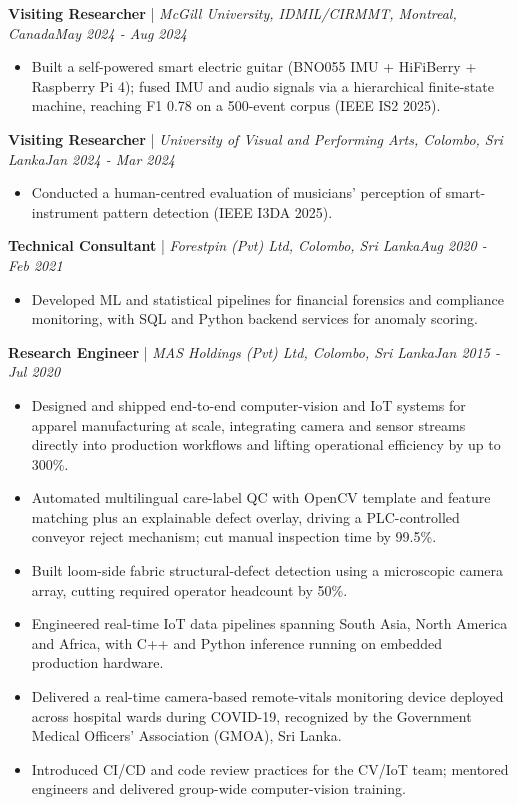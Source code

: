 \documentclass[11pt]{article}
\newenvironment{cvrole}[5]{%
  \par\noindent\textbf{\large #1} | \textit{\small #2, #3}\hfill \textit{\small #4 - #5}\par
  \begin{itemize}[leftmargin=2em, itemsep=-0.3em, topsep=-0.5em]%
}{%
  \end{itemize}\par\noindent\mbox{}\par\vspace{0.1em}%
}
\begin{document}
\begin{cvrole}{Visiting Researcher}{McGill University, IDMIL/CIRMMT}{Montreal, Canada}{May 2024}{Aug 2024}
\item Built a self-powered smart electric guitar (BNO055 IMU + HiFiBerry + Raspberry Pi 4); fused IMU and audio signals via a hierarchical finite-state machine, reaching F1 0.78 on a 500-event corpus (IEEE IS2 2025).
\end{cvrole}

\begin{cvrole}{Visiting Researcher}{University of Visual and Performing Arts}{Colombo, Sri Lanka}{Jan 2024}{Mar 2024}
\item Conducted a human-centred evaluation of musicians' perception of smart-instrument pattern detection (IEEE I3DA 2025).
\end{cvrole}

\begin{cvrole}{Technical Consultant}{Forestpin (Pvt) Ltd}{Colombo, Sri Lanka}{Aug 2020}{Feb 2021}
\item Developed ML and statistical pipelines for financial forensics and compliance monitoring, with SQL and Python backend services for anomaly scoring.
\end{cvrole}

\begin{cvrole}{Research Engineer}{MAS Holdings (Pvt) Ltd}{Colombo, Sri Lanka}{Jan 2015}{Jul 2020}
\item Designed and shipped end-to-end computer-vision and IoT systems for apparel manufacturing at scale, integrating camera and sensor streams directly into production workflows and lifting operational efficiency by up to 300\%.
\item Automated multilingual care-label QC with OpenCV template and feature matching plus an explainable defect overlay, driving a PLC-controlled conveyor reject mechanism; cut manual inspection time by 99.5\%.
\item Built loom-side fabric structural-defect detection using a microscopic camera array, cutting required operator headcount by 50\%.
\item Engineered real-time IoT data pipelines spanning South Asia, North America and Africa, with C++ and Python inference running on embedded production hardware.
\item Delivered a real-time camera-based remote-vitals monitoring device deployed across hospital wards during COVID-19, recognized by the Government Medical Officers' Association (GMOA), Sri Lanka.
\item Introduced CI/CD and code review practices for the CV/IoT team; mentored engineers and delivered group-wide computer-vision training.
\end{cvrole}
\end{document}
